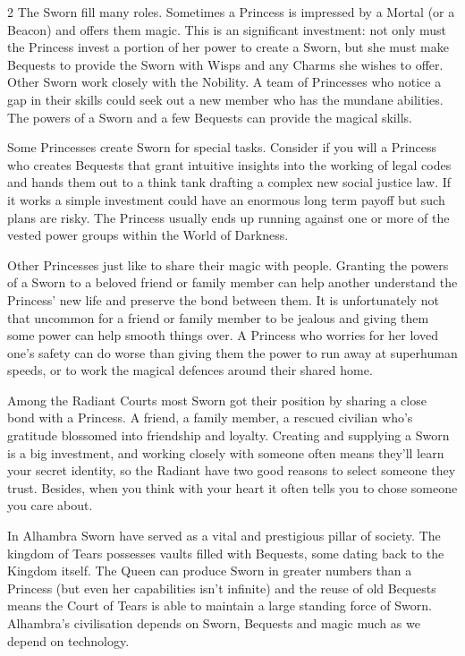 \begin{multicols}{2}
The Sworn fill many roles. Sometimes a Princess is impressed by a Mortal (or a Beacon) and offers them magic. This is an significant investment: not only must the Princess invest a portion of her power to create a Sworn, but she must make Bequests to provide the Sworn with Wisps and any Charms she wishes to offer. Other Sworn work closely with the Nobility. A team of Princesses who notice a gap in their skills could seek out a new member who has the mundane abilities. The powers of a Sworn and a few Bequests can provide the magical skills.

Some Princesses create Sworn for special tasks. Consider if you will a Princess who creates Bequests that grant intuitive insights into the working of legal codes and hands them out to a think tank drafting a complex new social justice law. If it works a simple investment could have an enormous long term payoff but such plans are risky. The Princess usually ends up running against one or more of the vested power groups within the World of Darkness.

Other Princesses just like to share their magic with people. Granting the powers of a Sworn to a beloved friend or family member can help another understand the Princess’ new life and preserve the bond between them. It is unfortunately not that uncommon for a friend or family member to be jealous and giving them some power can help smooth things over. A Princess who worries for her loved one’s safety can do worse than giving them the power to run away at superhuman speeds, or to work the magical defences around their shared home.

Among the Radiant Courts most Sworn got their position by sharing a close bond with a Princess. A friend, a family member, a rescued civilian who's gratitude blossomed into friendship and loyalty. Creating and supplying a Sworn is a big investment, and working closely with someone often means they'll learn your secret identity, so the Radiant have two good reasons to select someone they trust. Besides, when you think with your heart it often tells you to chose someone you care about. 

In Alhambra Sworn have served as a vital and prestigious pillar of society. The kingdom of Tears possesses vaults filled with Bequests, some dating back to the Kingdom itself. The Queen can produce Sworn in greater numbers than a Princess (but even her capabilities isn't infinite) and the reuse of old Bequests means the Court of Tears is able to maintain a large standing force of Sworn. Alhambra's civilisation depends on Sworn, Bequests and magic much as we depend on technology.


\end{multicols}
